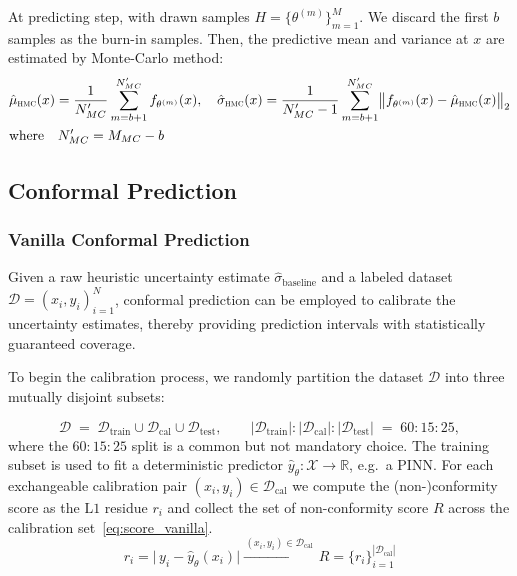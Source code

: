 \documentclass[preprint,12pt]{elsarticle}
\begin{document}
At predicting step, with drawn samples $H = \{\theta^{(m)}\}_{m=1}^M$. We discard the first $b$ samples as the burn-in samples. Then, the predictive mean and variance at $x$ are estimated by Monte-Carlo method:
\begin{equation}
    \begin{aligned}
        &\hat\mu_{\textsc{hmc}}(x)
        =
        \frac{1}{N_{MC}'}\sum_{m=b+1}^{N_{MC}'} f_{\theta^{(m)}}(x),
        \quad
        \hat\sigma_{\textsc{hmc}}(x)
        =
        \frac{1}{N_{MC}'-1}\sum_{m=b+1}^{N_{MC}'}
        \bigl\| f_{\theta^{(m)}}(x) - \hat\mu_{\textsc{hmc}}(x) \bigr\|_{2} \\
        &\text{where} \quad
        N_{MC}' = M_{MC} - b
    \end{aligned}
\label{eq:hmc_pred_mean_var} 
\end{equation}


\subsection{Conformal Prediction}
\label{sec:sub:cp}
\subsubsection{Vanilla Conformal Prediction}
\label{sec:sub:sub:vanilla_cp}
Given a raw heuristic uncertainty estimate $\hat \sigma_{\text{baseline}}$ and a labeled dataset $\mathcal{D} = {(x_i, y_i)}_{i=1}^{N}$, conformal prediction can be employed to calibrate the uncertainty estimates, thereby providing prediction intervals with statistically guaranteed coverage.

To begin the calibration process, we randomly partition the dataset $\mathcal{D}$ into three mutually disjoint subsets:

\begin{equation}
  \mathcal D \;=\;
  \mathcal D_{\mathrm{train}} \cup
  \mathcal D_{\mathrm{cal}} \cup
  \mathcal D_{\mathrm{test}},
  \qquad
  |\mathcal D_{\mathrm{train}}|:|\mathcal D_{\mathrm{cal}}|:|\mathcal D_{\mathrm{test}}|
  \;=\; 60:15:25 ,
  \label{eq:data_split_vanilla}
\end{equation}
%
where the $60 : 15 : 25$ split is a common but not mandatory choice. The training subset is used to fit a deterministic predictor $\hat y_{\theta}\!:\mathcal X\!\to\!\mathbb R$, e.g.\ a PINN. For each exchangeable calibration pair $(x_i,y_i)\in\mathcal D_{\mathrm{cal}}$ we compute the (non-)conformity score as the $\mathrm{L}1$ residue $r_i$ and collect the set of non-conformity score $R$ across the calibration set~\eqref{eq:score_vanilla}.
%
\begin{equation}
  r_i = \bigl|\,y_i - \hat y_{\theta}(x_i)\bigr|
  \xrightarrow{\,(x_i,y_i)\in\mathcal D_{\mathrm{cal}}\,}
  R = \{r_i\}_{i=1}^{|\mathcal D_{\mathrm{cal}}|}
  \label{eq:score_vanilla}
\end{equation}
%
\end{document}
